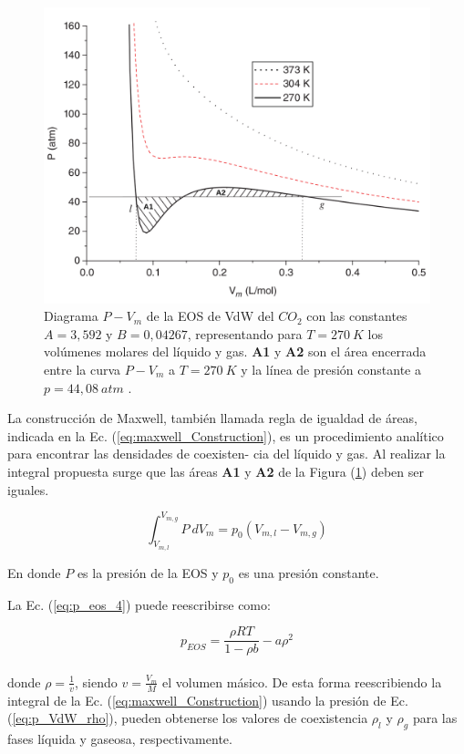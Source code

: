 \begin{figure}[htbp]
	\centering
	\includegraphics[width=.8\textwidth]{figs/cap4/Diagrama_P_V_del_CO2_Multiphase_LBM}
	\caption{Diagrama $P - V_m$ de la EOS de VdW del $CO_2$ con las constantes $A = 3,592$ y $B = 0,04267$, representando para $T = 270 \> K$ los volúmenes molares del líquido y gas. \textbf{A1} y \textbf{A2} son el área encerrada entre la curva $P - V_m$ a $T = 270 \> K$ y la línea de presión constante a  $p = 44,08 \> atm$ \cite{huang2015multiphase}.}
	\label{fig:P_V_CO2}	
\end{figure}

La construcción de Maxwell, también llamada regla de igualdad de áreas, indicada en la Ec. (\ref{eq:maxwell_Construction}), es un procedimiento analítico para encontrar las densidades de coexisten- cia del líquido y gas. Al realizar la integral propuesta surge que las áreas \textbf{A1} y \textbf{A2} de la Figura (\ref{fig:P_V_CO2}) deben ser iguales.

\begin{equation}
\int_{V_{m,l}}^{V_{m,g}} P \> d V_m = p_0 (V_{m,l} -  V_{m,g})
\label{eq:maxwell_Construction}
\end{equation}

En donde $P$ es la presión de la EOS y $p_0$ es una presión constante.

La Ec. (\ref{eq:p_eos_4}) puede reescribirse como:

\begin{equation}
	p_{EOS} = \frac{\rho R T}{1- \rho b} - a {\rho}^{2} 
	\label{eq:p_VdW_rho}
\end{equation}\\
donde $\rho = \frac{1}{v}$, siendo $v = \frac{V_m}{M}$ el volumen másico. De esta forma reescribiendo la integral de la Ec. (\ref{eq:maxwell_Construction}) usando la presión de Ec. (\ref{eq:p_VdW_rho}), pueden obtenerse los valores de coexistencia $\rho_l$ y $\rho_g$ para las fases líquida y gaseosa, respectivamente. 

